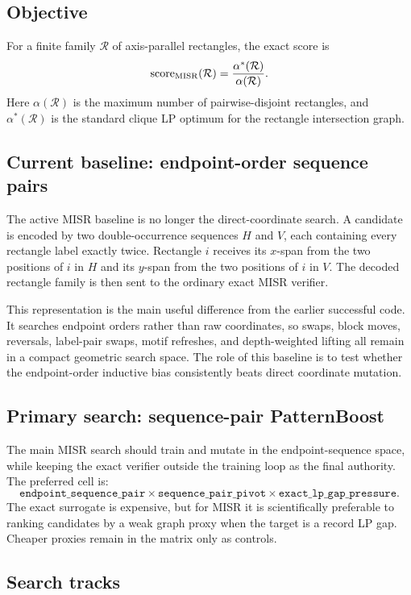 \documentclass[11pt]{article}
\newcommand{\Rcal}{\mathcal{R}}
\newcommand{\score}{\operatorname{score}}
\begin{document}
\subsection{Objective}

For a finite family $\Rcal$ of axis-parallel rectangles, the exact score is
\[
        \score_{\rm MISR}(\Rcal)=\frac{\alpha^*(\Rcal)}{\alpha(\Rcal)}.
\]
Here $\alpha(\Rcal)$ is the maximum number of pairwise-disjoint rectangles, and
$\alpha^*(\Rcal)$ is the standard clique LP optimum for the rectangle
intersection graph.

\subsection{Current baseline: endpoint-order sequence pairs}

The active MISR baseline is no longer the direct-coordinate search.  A candidate
is encoded by two double-occurrence sequences $H$ and $V$, each containing every
rectangle label exactly twice.  Rectangle $i$ receives its $x$-span from the two
positions of $i$ in $H$ and its $y$-span from the two positions of $i$ in $V$.
The decoded rectangle family is then sent to the ordinary exact MISR verifier.

This representation is the main useful difference from the earlier successful
code.  It searches endpoint orders rather than raw coordinates, so swaps,
block moves, reversals, label-pair swaps, motif refreshes, and depth-weighted
lifting all remain in a compact geometric search space.  The role of this
baseline is to test whether the endpoint-order inductive bias consistently
beats direct coordinate mutation.

\subsection{Primary search: sequence-pair PatternBoost}

The main MISR search should train and mutate in the endpoint-sequence space,
while keeping the exact verifier outside the training loop as the final
authority.  The preferred cell is:
\[
  \texttt{endpoint\_sequence\_pair}
  \times
  \texttt{sequence\_pair\_pivot}
  \times
  \texttt{exact\_lp\_gap\_pressure}.
\]
The exact surrogate is expensive, but for MISR it is scientifically preferable
to ranking candidates by a weak graph proxy when the target is a record LP gap.
Cheaper proxies remain in the matrix only as controls.

\subsection{Search tracks}
\end{document}
